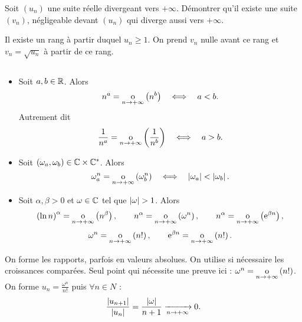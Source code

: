 \documentclass{magnoliaold}
\begin{document}

\begin{exoUnique}
\exo Soit $(u_n)$ une suite réelle divergeant vers $+\infty$. Démontrer
  qu'il existe une suite $(v_n)$, négligeable devant $(u_n)$ qui diverge aussi
  vers $+\infty$.
\end{exoUnique}

\begin{sol}
Il existe un rang à partir duquel $u_n\geq 1$. On prend $v_n$ nulle avant ce rang et $v_n=\sqrt{u_n}$ à partir de ce rang.
\end{sol}

\begin{proposition}[utile=-3]
$\quad$
\begin{itemize}
\item Soit $a,b\in\mathbb{R}$. Alors
  \[n^a = \underset{n \rightarrow +\infty}{\text{o}}\left(n^b\right) \quad\Longleftrightarrow\quad a<b.\]
  Autrement dit
  \[\frac{1}{n^a} = \underset{n \rightarrow +\infty}{\text{o}}\left(\frac{1}{n^b}\right) \quad\Longleftrightarrow\quad a>b.\]
\item Soit $(\omega_a,\omega_b)\in\mathbb{C}\times\mathbb{C}^*$. Alors
  \[\omega_a^n = \underset{n \rightarrow +\infty}{\text{o}}\left(\omega_b^n\right) \quad\Longleftrightarrow\quad
    \left|\omega_a\right| < \left|\omega_b\right|.\]
\item Soit $\alpha,\beta>0$ et $\omega\in\mathbb{C}$ tel que $\abs{\omega}>1$. Alors
  \[\left(\ln n\right)^\alpha = \underset{n \rightarrow +\infty}{\text{o}}\left(n^\beta\right), \qquad
    n^\alpha = \underset{n \rightarrow +\infty}{\text{o}}\left(\omega^n\right), \qquad
    n^\alpha=\underset{n \rightarrow +\infty}{\text{o}}\left({\rm e}^{\beta n}\right),\]
  \[\omega^n = \underset{n \rightarrow +\infty}{\text{o}}\left(n!\right), \qquad
    {\rm e}^{\beta n} = \underset{n \rightarrow +\infty}{\text{o}}\left(n!\right).\]
\end{itemize}
\end{proposition}
\begin{preuve}
On forme les rapports, parfois en valeurs absolues. On utilise si nécessaire les croissances comparées.
Seul point qui nécessite une preuve ici :
$\omega^n = \underset{n \rightarrow +\infty}{\text{o}}\left(n!\right)$. On forme $\displaystyle u_n=\frac{\omega^n}{n!}$ puis $\forall n\in N$ :
$$\frac{\left|u_{n+1}\right|}{\left|u_n\right|}=\frac{\left|\omega\right|}{n+1}\xrightarrow[n\rightarrow +\infty]{}{0}.$$
\end{preuve}
\end{document}
